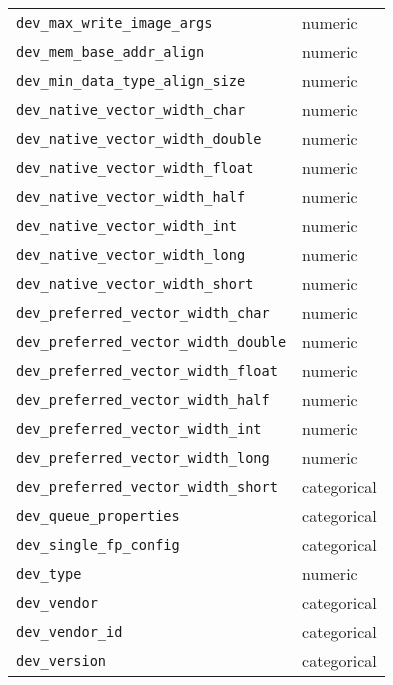 \begin{tabular}{ll}
  \texttt{dev\_max\_write\_image\_args} & numeric \\
  \texttt{dev\_mem\_base\_addr\_align} & numeric \\
  \texttt{dev\_min\_data\_type\_align\_size} & numeric \\
  \texttt{dev\_native\_vector\_width\_char} & numeric \\
  \texttt{dev\_native\_vector\_width\_double} & numeric \\
  \texttt{dev\_native\_vector\_width\_float} & numeric \\
  \texttt{dev\_native\_vector\_width\_half} & numeric \\
  \texttt{dev\_native\_vector\_width\_int} & numeric \\
  \texttt{dev\_native\_vector\_width\_long} & numeric \\
  \texttt{dev\_native\_vector\_width\_short} & numeric \\
  \texttt{dev\_preferred\_vector\_width\_char} & numeric \\
  \texttt{dev\_preferred\_vector\_width\_double} & numeric \\
  \texttt{dev\_preferred\_vector\_width\_float} & numeric \\
  \texttt{dev\_preferred\_vector\_width\_half} & numeric \\
  \texttt{dev\_preferred\_vector\_width\_int} & numeric \\
  \texttt{dev\_preferred\_vector\_width\_long} & numeric \\
  \texttt{dev\_preferred\_vector\_width\_short} & categorical \\
  \texttt{dev\_queue\_properties} & categorical \\
  \texttt{dev\_single\_fp\_config} & categorical \\
  \texttt{dev\_type} & numeric \\
  \texttt{dev\_vendor} & categorical \\
  \texttt{dev\_vendor\_id} & categorical \\
  \texttt{dev\_version} & categorical \\
  \bottomrule
\end{tabular}

